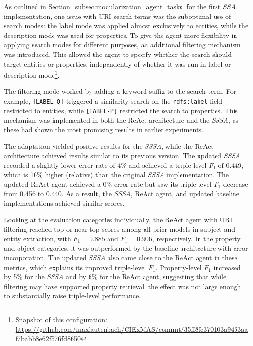 \documentclass[a4paper,oneside,bibliography=totoc]{scrbook}
\begin{document}
As outlined in Section~\ref{subsec:modularization_agent_tasks} for the first \textit{\ac{SSA}} implementation, one issue with \ac{URI} search terms was the suboptimal use of search modes: the label mode was applied almost exclusively to entities, while the description mode was used for properties. To give the agent more flexibility in applying search modes for different purposes, an additional filtering mechanism was introduced. This allowed the agent to specify whether the search should target entities or properties, independently of whether it was run in label or description mode\footnote{Snapshot of this configuration: \url{https://github.com/maxlautenbach/CIExMAS/commit/35ff8fc370103a9453aaf7babb8e62f576fd8650}}.

The filtering mode worked by adding a keyword suffix to the search term. For example, \texttt{[LABEL-Q]} triggered a similarity search on the \texttt{rdfs:label} field restricted to entities, while \texttt{[LABEL-P]} restricted the search to properties. This mechanism was implemented in both the ReAct architecture and the \textit{\ac{SSSA}}, as these had shown the most promising results in earlier experiments.

The adaptation yielded positive results for the \textit{\ac{SSSA}}, while the ReAct architecture achieved results similar to its previous version. The updated \textit{\ac{SSSA}} recorded a slightly lower error rate of 4\% and achieved a triple-level $F_{1}$ of 0.449, which is 16\% higher (relative) than the original \textit{\ac{SSSA}} implementation. The updated ReAct agent achieved a 0\% error rate but saw its triple-level $F_{1}$ decrease from 0.456 to 0.440. As a result, the \textit{\ac{SSSA}}, ReAct agent, and updated baseline implementations achieved similar scores.

Looking at the evaluation categories individually, the ReAct agent with \ac{URI} filtering reached top or near-top scores among all prior models in subject and entity extraction, with $F_{1}=0.885$ and $F_{1}=0.906$, respectively. In the property and object categories, it was outperformed by the baseline architecture with error incorporation. The updated \textit{\ac{SSSA}} also came close to the ReAct agent in these metrics, which explains its improved triple-level $F_{1}$. Property-level $F_{1}$ increased by 5\% for the \textit{\ac{SSSA}} and by 6\% for the ReAct agent, suggesting that while filtering may have supported property retrieval, the effect was not large enough to substantially raise triple-level performance.
\end{document}
